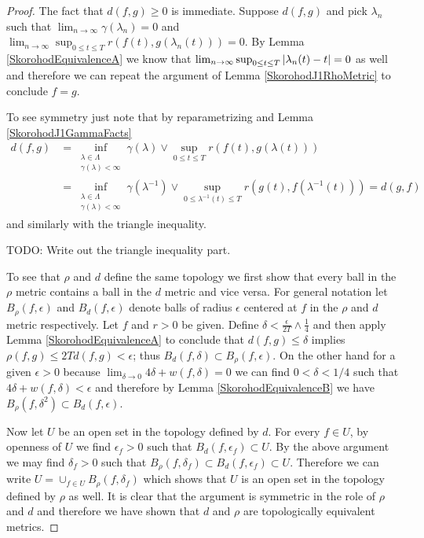 \begin{proof}
The fact that $d(f,g) \geq 0$ is immediate. Suppose $d(f,g)$ and pick $\lambda_n$ such that
$\lim_{n \to \infty} \gamma(\lambda_n) = 0$ and $\lim_{n \to \infty} \sup_{0 \leq t \leq
  T} r(f(t), g(\lambda_n(t))) = 0$.  By Lemma
\ref{SkorohodEquivalenceA}  we know that $\lim_{n \to \infty} \sup_{0
  \leq t \leq T} \left \vert \lambda_n(t) - t \right \vert = 0$ as well and therefore we
can repeat the argument of Lemma \ref{SkorohodJ1RhoMetric} to conclude $f=g$.

To see symmetry just note that by reparametrizing and Lemma \ref{SkorohodJ1GammaFacts}
\begin{align*}
d(f,g) &= \inf_{\substack{\lambda \in \Lambda \\ \gamma(\lambda) <
    \infty}} \gamma(\lambda) \vee \sup_{0 \leq t \leq T} r(f(t),
g(\lambda(t))) \\
&= \inf_{\substack{\lambda \in \Lambda \\ \gamma(\lambda) <
    \infty}} \gamma(\lambda^{-1}) \vee \sup_{0 \leq \lambda^{-1}(t) \leq T}
r(g(t), f(\lambda^{-1}(t))) = d(g,f)
\end{align*}
and similarly with the triangle inequality.

TODO: Write out the triangle inequality part.

To see that $\rho$ and $d$ define the same topology we first show that every ball
in the $\rho$ metric contains a ball in the $d$ metric and vice versa.  For general notation
let $B_\rho(f,\epsilon)$ and $B_d(f,\epsilon)$ denote balls of radius $\epsilon$ centered at $f$ in the $\rho$ and $d$ metric
respectively.  Let $f$ and $r > 0$ be given.  Define $\delta < \frac{\epsilon}{2T} \wedge \frac{1}{4}$ and then apply Lemma \ref{SkorohodEquivalenceA}
to conclude that $d(f,g) \leq \delta$ implies $\rho(f,g) \leq 2T d(f,g) < \epsilon$; thus $B_d(f,\delta) \subset B_\rho(f,\epsilon)$.  On the other hand for a given $\epsilon>0$
because $\lim_{\delta \to 0} 4 \delta + w(f,\delta) = 0$ we can find $0 < \delta < 1/4$ such that $4 \delta + w(f,\delta) < \epsilon$ and therefore
by Lemma \ref{SkorohodEquivalenceB} we have $B_\rho(f, \delta^2) \subset B_d(f, \epsilon)$.

Now let $U$ be an open set in the topology defined by $d$.  For every $f \in U$, by openness of $U$ we find $\epsilon_f>0$ such that $B_d(f,\epsilon_f) \subset U$.
By the above argument we may find $\delta_f>0$ such that $B_\rho(f, \delta_f) \subset B_d(f,\epsilon_f) \subset U$.  Therefore we can write $U = \cup_{f \in U} B_\rho(f, \delta_f)$
which shows that $U$ is an open set in the topology defined by $\rho$ as well.  It is clear that the argument is symmetric in the role of $\rho$ and $d$ and therefore we
have shown that $d$ and $\rho$ are topologically equivalent metrics.
\end{proof}

